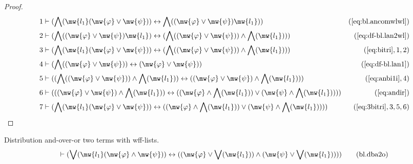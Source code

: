 \begin{proof}
\begin{align}
  1 & \vdash ( \bigwedge( \mw{l_1} ( \mw{\varphi} \vee \mw{\psi} ) ) \leftrightarrow
    \bigwedge( ( \mw{\varphi} \vee \mw{\psi} ) \mw{l_1} )
    )&(\mbox{\ref{eq:bl.ancomwlwl}})\notag
  \\ 2 & \vdash ( \bigwedge( ( \mw{\varphi} \vee \mw{\psi} ) \mw{l_1} )
    \leftrightarrow ( \bigwedge( ( \mw{\varphi} \vee \mw{\psi} ) )
    \wedge \bigwedge( \mw{l_1} ) )
    )&(\mbox{\ref{eq:df-bl.lan2wl}})\notag
  \\ 3 & \vdash ( \bigwedge( \mw{l_1} ( \mw{\varphi} \vee \mw{\psi} ) )
    \leftrightarrow ( \bigwedge( ( \mw{\varphi} \vee \mw{\psi} ) )
    \wedge \bigwedge( \mw{l_1} ) )
    )&(\mbox{\ref{eq:bitri}},1,2)\notag
  \\ 4 & \vdash ( \bigwedge( ( \mw{\varphi} \vee \mw{\psi} ) ) \leftrightarrow (
    \mw{\varphi} \vee \mw{\psi} )
    )&(\mbox{\ref{eq:df-bl.lan1}})\notag
  \\ 5 & \vdash ( ( \bigwedge( ( \mw{\varphi} \vee \mw{\psi} ) ) \wedge \bigwedge(
    \mw{l_1} ) ) \leftrightarrow ( ( \mw{\varphi} \vee \mw{\psi} )
    \wedge \bigwedge( \mw{l_1} ) )
    )&(\mbox{\ref{eq:anbi1i}},4)\notag
  \\ 6 & \vdash ( ( ( \mw{\varphi} \vee \mw{\psi} ) \wedge \bigwedge( \mw{l_1} ) )
    \leftrightarrow ( ( \mw{\varphi} \wedge \bigwedge(
    \mw{l_1} ) ) \vee ( \mw{\psi} \wedge \bigwedge( \mw{l_1} )
    ) ) )&(\mbox{\ref{eq:andir}})\notag
  \\ 7 & \vdash ( \bigwedge( \mw{l_1} ( \mw{\varphi} \vee \mw{\psi} ) )
    \leftrightarrow ( ( \mw{\varphi} \wedge \bigwedge(
    \mw{l_1} ) ) \vee ( \mw{\psi} \wedge \bigwedge( \mw{l_1} )
    ) ) )&(\mbox{\ref{eq:3bitri}},3,5,6)\notag
\end{align}
\end{proof}

\begin{lemma} Distribution and-over-or two terms with
wff-lists.
\begin{align}
\vdash ( \bigvee( \mw{l_1} ( \mw{\varphi} \wedge \mw{\psi} ) ) \leftrightarrow
    ( ( \mw{\varphi} \vee \bigvee( \mw{l_1} ) ) \wedge ( \mw{\psi} \vee
    \bigvee( \mw{l_1} ) ) ) )\label{eq:bl.dba2o}\tag{bl.dba2o}
\end{align}
\end{lemma}

